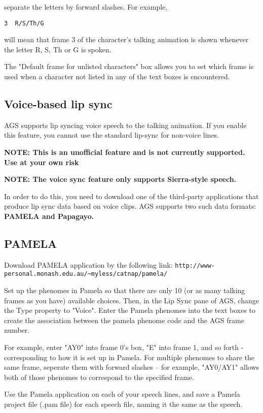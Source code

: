 separate the letters by forward slashes. For example,

\begin{verbatim}
3  R/S/Th/G
\end{verbatim}

will mean that frame 3 of the character's talking animation is shown whenever the
letter R, S, Th or G is spoken.

The "Default frame for unlisted characters" box allows you to set which frame is used
when a character not listed in any of the text boxes is encountered.

\subsection{Voice-based lip sync}%

AGS supports lip syncing voice speech to the talking animation. If you enable this
feature, you cannot use the standard lip-sync for non-voice lines.

\bf{NOTE: This is an unofficial feature and is not currently supported. Use at
your own risk}

\bf{NOTE:} The voice sync feature only supports Sierra-style speech.

In order to do this, you need to download one of the third-party applications that produce
lip sync data based on voice clips.
AGS supports two such data formats: \bf{PAMELA} and \bf{Papagayo}.

\subsection{PAMELA}

Download PAMELA application by the following link:
\verb$http://www-personal.monash.edu.au/~myless/catnap/pamela/$

Set up the phenomes in Pamela so that there are only 10 (or as many talking frames as you have)
available choices. Then, in the Lip Sync pane of AGS, change the Type property to "Voice".
Enter the Pamela phenomes into the text boxes to create the association
between the pamela phenome code and the AGS frame number.

For example, enter "AY0" into frame 0's box, "E" into frame 1, and so forth - corresponding
to how it is set up in Pamela. For multiple phenomes to share the same frame, seperate them
with forward slashes -- for example, "AY0/AY1" allows both of those phenomes to correspond
to the specified frame.

Use the Pamela application on each of your speech lines, and save a Pamela project file
(.pam file) for each speech file, naming it the same as the speech.

